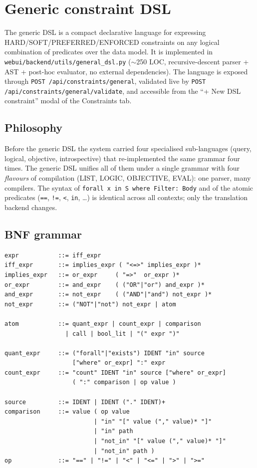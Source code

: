 \chapter{Generic constraint DSL}
\label{ch:dsl_generico_per_i_vincoli_en}

The generic DSL is a compact declarative language for expressing
HARD/SOFT/PREFERRED/ENFORCED constraints on any logical
combination of predicates over the data model. It is implemented
in \texttt{webui/backend/utils/general\_dsl.py} ($\sim$250 LOC,
recursive-descent parser + AST + post-hoc evaluator, no external
dependencies). The language is exposed through
\texttt{POST /api/constraints/general}, validated live by
\texttt{POST /api/constraints/general/validate}, and accessible
from the ``+ New DSL constraint'' modal of the Constraints tab.

\section{Philosophy}

Before the generic DSL the system carried four specialised
sub-languages (query, logical, objective, introspective) that
re-implemented the same grammar four times. The generic DSL
unifies all of them under a single grammar with four
\emph{flavours} of compilation (LIST, LOGIC, OBJECTIVE, EVAL):
one parser, many compilers. The syntax of
\texttt{forall x in S where Filter: Body} and of the atomic
predicates (\texttt{==}, \texttt{!=}, \texttt{<},
\texttt{in}, \dots) is identical across all contexts; only the
translation backend changes.

\section{BNF grammar}
\label{sec:dsl-bnf-en}

\begin{lstlisting}[basicstyle=\ttfamily\small]
expr           ::= iff_expr
iff_expr       ::= implies_expr ( "<=>" implies_expr )*
implies_expr   ::= or_expr     ( "=>"  or_expr )*
or_expr        ::= and_expr    ( ("OR"|"or") and_expr )*
and_expr       ::= not_expr    ( ("AND"|"and") not_expr )*
not_expr       ::= ("NOT"|"not") not_expr | atom

atom           ::= quant_expr | count_expr | comparison
                 | call | bool_lit | "(" expr ")"

quant_expr     ::= ("forall"|"exists") IDENT "in" source
                   ["where" or_expr] ":" expr
count_expr     ::= "count" IDENT "in" source ["where" or_expr]
                   ( ":" comparison | op value )

source         ::= IDENT | IDENT ("." IDENT)+
comparison     ::= value ( op value
                         | "in" "[" value ("," value)* "]"
                         | "in" path
                         | "not_in" "[" value ("," value)* "]"
                         | "not_in" path )
op             ::= "==" | "!=" | "<" | "<=" | ">" | ">="
\end{lstlisting}

